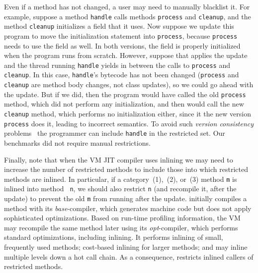 Even if a method has not changed, a user may need to manually blacklist it.  
For example, suppose a method \texttt{handle} calls
methods \texttt{process} and \texttt{cleanup}, and the method
\texttt{cleanup} initializes a field that it uses.  Now suppose we
update this program to move the initialization statement into
\texttt{process}, because \texttt{process} needs to use the
field as well.  In both versions, the field is properly
initialized when the program runs from scratch.  However, suppose that
\DSU{}  applies the update and the thread running \texttt{handle}
yields in between the calls to \texttt{process} and \texttt{cleanup}.
In this case, \texttt{handle}'s bytecode has not been changed
(\texttt{process} and \texttt{cleanup} are method body changes, not
class updates), so we
could go ahead with the update.  But if we did, then the program would
have called the old \texttt{process} method, which did not perform any
initialization, and then would call the new
\texttt{cleanup} method, which performs no initialization either,
since it the new version \texttt{process} does it, leading to incorrect semantics.  %
To avoid
such \emph{version consistency}
problems~\cite{neamtiu08context} the programmer can include
\texttt{handle} in the restricted set.  Our benchmarks did not require 
manual restrictions.

Finally, note that when the VM JIT compiler uses inlining we may need
to increase the 
number of restricted methods to include those into which restricted
methods are inlined.  In particular, if a
category~(1),~(2), or~(3) method {\tt m} is inlined into method {\tt
  n}, we should also restrict {\tt n} (and recompile it, after the
update) to prevent the old {\tt m} from running after the update.
\JikesRVM{} 
initially compiles a method with its \emph{base}-compiler, which
generates machine code but does not apply sophisticated
optimizations. Based on run-time profiling information, the VM may
recompile the same method later using its \emph{opt}-compiler, which performs
standard optimizations, including inlining.
It performs inlining of small, frequently used methods; cost-based
inlining for larger methods; and may inline multiple levels down a hot call chain.  
As a consequence, \DSU{} restricts inlined callers of restricted methods.

